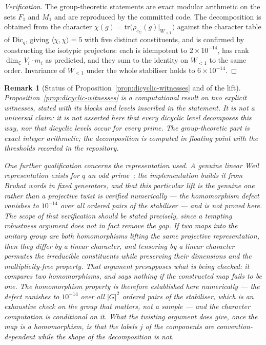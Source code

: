 \documentclass[11pt,a4paper]{article}
\newtheorem{remark}[theorem]{Remark}
\begin{document}
    \begin{proof}[Verification]
      The group-theoretic statements are exact modular arithmetic on the sets $F_{1}$ and
      $M_{1}$ and are reproduced by the committed code.
      The decomposition is obtained from the character
      $\chi(g) = \mathrm{tr}\big(\rho_{c_{\Sigma}}(g)|_{W_{<1}}\big)$ against the character
      table of $\mathrm{Dic}_{q}$, giving $\langle \chi, \chi \rangle = 5$ with five distinct
      constituents, and is confirmed by constructing the isotypic projectors: each is idempotent
      to $2 \times 10^{-14}$, has rank $\dim_{\mathbb{C}} V_{i} \cdot m_{i}$ as predicted, and
      they sum to the identity on $W_{<1}$ to the same order.
      Invariance of $W_{<1}$ under the whole stabiliser holds to $6 \times 10^{-14}$.
    \end{proof}

    \begin{remark}[Status of Proposition~\ref{prop:dicyclic-witnesses} and of the lift]
      \label{rem:witness-status}
      Proposition~\ref{prop:dicyclic-witnesses} is a computational result on two explicit
      witnesses, stated with its blocks and levels inscribed in the statement.
      It is not a universal claim: it is not asserted here that every dicyclic level decomposes
      this way, nor that dicyclic levels occur for every prime.
      The group-theoretic part is exact integer arithmetic; the decomposition is computed in
      floating point with the thresholds recorded in the repository.

      One further qualification concerns the representation used.
      A genuine linear Weil representation exists for $q$ an odd
      prime~\cite{Weil1964,Gerardin1977}; the implementation builds it from Bruhat words in
      fixed generators, and that this particular lift is the genuine one rather than a
      projective twist is verified numerically --- the homomorphism defect vanishes to
      $10^{-14}$ over all ordered pairs of the stabiliser --- and is not proved here.
      The scope of that verification should be stated precisely, since a tempting robustness
      argument does not in fact remove the gap.
      \emph{If} two maps into the unitary group are both homomorphisms lifting the same
      projective representation, then they differ by a linear character, and tensoring by a
      linear character permutes the irreducible constituents while preserving their dimensions
      and the multiplicity-free property.
      That argument presupposes what is being checked: it compares two homomorphisms, and says
      nothing if the constructed map fails to be one.
      The homomorphism property is therefore established here numerically --- the defect
      vanishes to $10^{-14}$ over all $|G|^{2}$ ordered pairs of the stabiliser, which is an
      exhaustive check on the group that matters, not a sample --- and the character
      computation is conditional on it.
      What the twisting argument does give, once the map is a homomorphism, is that the
      \emph{labels} $j$ of the components are convention-dependent while the shape of the
      decomposition is not.
    \end{remark}
\end{document}
